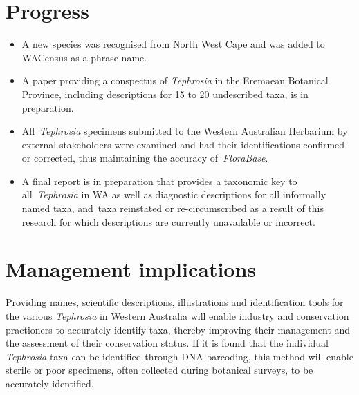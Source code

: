 \documentclass[version=last,
    paper=a4, %
    10pt, %
    usenames,
    dvipsnames,
    oneside, %
    headings=openany, %
    DIV=15 %
]{scrbook}
\begin{document}
\section*{Progress}
\begin{itemize}
\itemsep1pt\parskip0pt
\item
  A new species was recognised from North West Cape and was added to
  WACensus as a phrase name.
\item
  A paper providing a conspectus of \emph{Tephrosia} in the Eremaean
  Botanical Province, including descriptions for 15 to 20 undescribed
  taxa, is in preparation.
\item
  All~\emph{Tephrosia} specimens submitted to the Western Australian
  Herbarium by external stakeholders were examined and had their
  identifications confirmed or corrected, thus maintaining the accuracy
  of~\emph{FloraBase}.
\item
  A final report is in preparation that provides a taxonomic key to
  all~\emph{Tephrosia} in WA as well as diagnostic descriptions for all
  informally named taxa, and~taxa reinstated or re-circumscribed as a
  result of this research for which descriptions are currently
  unavailable or incorrect.
\end{itemize}



\section*{Management implications}
Providing names, scientific descriptions, illustrations and
identification tools for the various \emph{Tephrosia} in Western
Australia will enable industry and conservation practioners to
accurately identify taxa, thereby improving their management and the
assessment of their conservation status. If it is found that the
individual \emph{Tephrosia} taxa can be identified through DNA
barcoding, this method will enable sterile or poor specimens, often
collected during botanical surveys, to be accurately identified.
\end{document}
